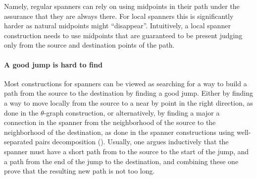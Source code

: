 \documentclass[12pt]{article}%
\begin{document}
Namely, regular spanners can rely on using midpoints in their path
under the assurance that they are always there. For local spanners
this is significantly harder as natural midpoints might
``disappear''. Intuitively, a local spanner construction needs to use
midpoints that are guaranteed to be present judging only from the
source and destination points of the path.


\paragraph{A good jump is hard to find}

Most constructions for spanners can be viewed as searching for a way
to build a path from the source to the destination by finding a good
jump. Either by finding a way to move locally from the source to a
near by point in the right direction, as done in the $\theta$-graph
construction, or alternatively, by finding a major a connection in the
spanner from the neighborhood of the source to the neighborhood of the
destination, as done in the spanner constructions using well-separated
pairs decomposition (\WSPD). Usually, one argues inductively that the
spanner must have a short path from to the source to the start of the
jump, and a path from the end of the jump to the destination, and
combining these one prove that the resulting new path is not too long.
\end{document}

